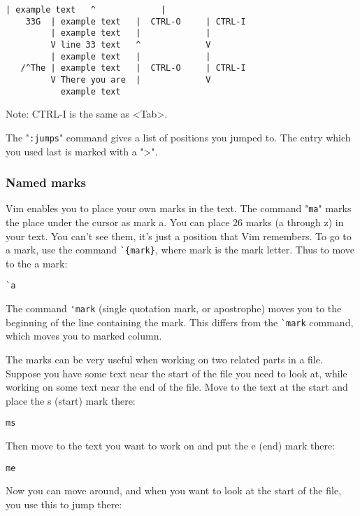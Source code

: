 \begin{Verbatim}[samepage=true]
         | example text   ^             |
    33G  | example text   |  CTRL-O     | CTRL-I
         | example text   |             |
         V line 33 text   ^             V
         | example text   |             |
   /^The | example text   |  CTRL-O     | CTRL-I
         V There you are  |             V
           example text
\end{Verbatim}

Note:
CTRL-I is the same as <Tab>.

The "\verb!:jumps!" command gives a list of positions you jumped to.
The entry which you used last is marked with a ">".

\subsubsection{Named marks}
\label{bookmark}

Vim enables you to place your own marks in the text.
The command "\verb!ma!" marks the place under the cursor as mark a.
You can place 26 marks (a through z) in your text.
You can't see them, it's just a position that Vim remembers.
To go to a mark, use the command \verb!`{mark}!, where {mark} is the mark letter.
Thus to move to the a mark:

 \begin{Verbatim}[samepage=true]
 `a
 \end{Verbatim}

The command \verb!'mark! (single quotation mark, or apostrophe) moves you to the beginning of the line containing the mark.
This differs from the \verb!`mark! command, which moves you to marked column.

The marks can be very useful when working on two related parts in a file.
Suppose you have some text near the start of the file you need to look at, while working on some text near the end of the file.
Move to the text at the start and place the s (start) mark there:

 \begin{Verbatim}[samepage=true]
 ms
 \end{Verbatim}

Then move to the text you want to work on and put the e (end) mark there:

 \begin{Verbatim}[samepage=true]
 me
 \end{Verbatim}

Now you can move around, and when you want to look at the start of the file, you use this to jump there:

